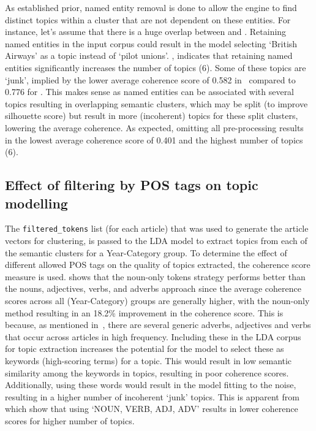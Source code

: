 As established prior, named entity removal is done to allow the engine to find distinct topics within a cluster that are not dependent on these entities. For instance, let's assume that there is a huge overlap between  and . Retaining named entities in the input corpus could result in the model selecting `British Airways' as a topic instead of `pilot unions'. , indicates that retaining named entities significantly increases the number of topics (6). Some of these topics are `junk', implied by the lower average coherence score of 0.582 in~ compared to 0.776 for . This makes sense as named entities can be associated with several topics resulting in overlapping semantic clusters, which may be split (to improve silhouette score) but result in more (incoherent) topics for these split clusters, lowering the average coherence. As expected, omitting all pre-processing results in the lowest average coherence score of 0.401 and the highest number of topics (6). 

\subsection{Effect of filtering by POS tags on topic modelling} \label{s:pos_topic}

The \texttt{filtered\_tokens} list (for each article) that was used to generate the article vectors for clustering, is passed to the LDA model to extract topics from each of the semantic clusters for a Year-Category group. To determine the effect of different allowed POS tags on the quality of topics extracted, the coherence score measure is used.  shows that the noun-only tokens strategy performs better than the nouns, adjectives, verbs, and adverbs approach since the average coherence scores across all (Year-Category) groups are generally higher, with the noun-only method resulting in an 18.2\% improvement in the coherence score. This is because, as mentioned in~, there are several generic adverbs, adjectives and verbs that occur across articles in high frequency. Including these in the LDA corpus for topic extraction increases the potential for the model to select these as keywords (high-scoring terms) for a topic. This would result in low semantic similarity among the keywords in topics, resulting in poor coherence scores. Additionally, using these words would result in the model fitting to the noise, resulting in a higher number of incoherent `junk' topics. This is apparent from  which show that using `NOUN, VERB, ADJ, ADV' results in lower coherence scores for higher number of topics.

